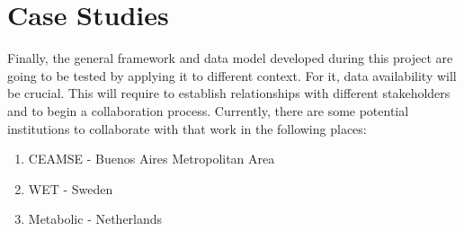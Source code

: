 \section{Case Studies}
Finally, the general framework and data model developed during this project are going to be tested by applying it to different context. For it, data availability will be crucial. This will require to establish relationships with different stakeholders and to begin a collaboration process. Currently, there are some potential institutions to collaborate with that work in the following places:
\begin{enumerate}
    \item CEAMSE - Buenos Aires Metropolitan Area
    \item WET - Sweden
    \item Metabolic - Netherlands
\end{enumerate}









